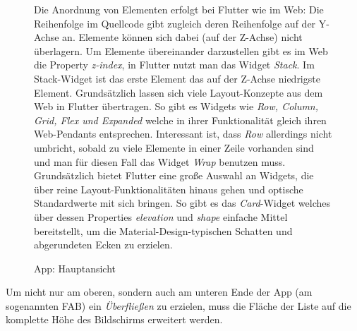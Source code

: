 \begin{figure}[H]
        \caption{
            App: Hauptansicht
        }
    \endminipage\hfill
    \vspace{0pt}
        Die Anordnung von Elementen erfolgt bei Flutter wie im Web:
        Die Reihenfolge im Quellcode gibt zugleich deren Reihenfolge auf
        der Y-Achse an. Elemente können sich dabei (auf der Z-Achse)
        nicht überlagern. Um Elemente übereinander darzustellen gibt es
        im Web die Property \textit{z-index}, in Flutter nutzt man das Widget
        \textit{Stack}. Im Stack-Widget ist das erste Element das auf der
        Z-Achse niedrigste Element. Grundsätzlich lassen sich viele
        Layout-Konzepte aus dem Web in Flutter übertragen. So gibt es
        Widgets wie \textit{Row, Column, Grid, Flex und Expanded} welche
        in ihrer Funktionalität gleich ihren Web-Pendants entsprechen.
        Interessant ist, dass \textit{Row} allerdings nicht umbricht,
        sobald zu viele Elemente in einer Zeile vorhanden sind und man
        für diesen Fall das Widget \textit{Wrap} benutzen muss.
        Grundsätzlich bietet Flutter eine große Auswahl an Widgets, die über
        reine Layout-Funktionalitäten hinaus gehen und optische Standardwerte
        mit sich bringen. So gibt es das \textit{Card}-Widget welches über
        dessen Properties \textit{elevation} und \textit{shape} einfache
        Mittel bereitstellt, um die Material-Design-typischen Schatten
        und abgerundeten Ecken zu erzielen.

    \endminipage\hfill
\end{figure}
Um nicht nur am oberen, sondern auch am unteren Ende der App
(am sogenannten \ac{FAB}) ein \textit{Überfließen} zu erzielen,
muss die Fläche der Liste auf die komplette Höhe des
Bildschirms erweitert werden.

